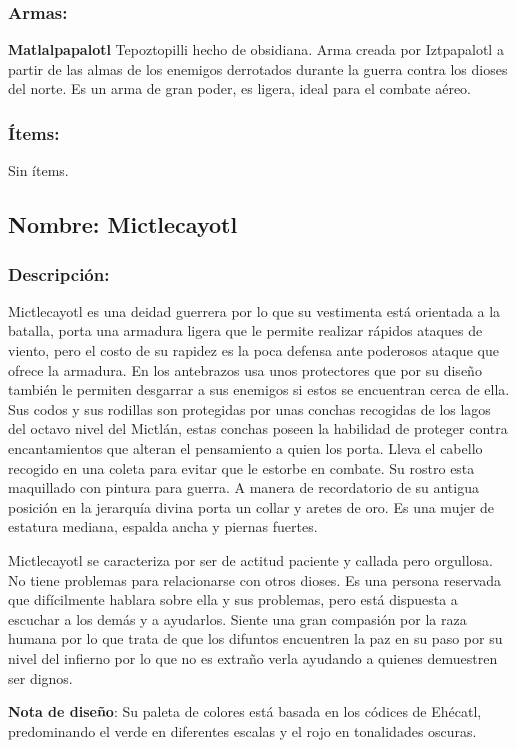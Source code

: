 \documentclass[11pt,letterpaper]{article}
\begin{document}
\subsubsection{Armas:}
\textbf{Matlalpapalotl} Tepoztopilli hecho de obsidiana. Arma creada por Iztpapalotl a partir de las almas de los enemigos derrotados durante la guerra contra los dioses del norte. Es un arma de gran poder, es ligera, ideal para el combate aéreo.
\subsubsection{Ítems:}
Sin ítems.



\subsection{Nombre: Mictlecayotl}  \label{per.mictlecayotl}

\subsubsection{Descripción:}
Mictlecayotl es una deidad guerrera por lo que su vestimenta está orientada a la batalla, porta una armadura ligera que le permite realizar rápidos ataques de viento, pero el costo de su rapidez es la poca defensa ante poderosos ataque que ofrece la armadura. En los antebrazos usa unos protectores que por su diseño también le permiten desgarrar a sus enemigos si estos se encuentran cerca de ella. Sus codos y sus rodillas son protegidas por unas conchas recogidas de los lagos del octavo nivel del Mictlán, estas conchas poseen la habilidad de proteger contra encantamientos que alteran el pensamiento a quien los porta. Lleva el cabello recogido en una coleta para evitar que le estorbe en combate. Su rostro esta maquillado con pintura para guerra. A manera de recordatorio de su antigua posición en la jerarquía divina porta un collar y aretes de oro. Es una mujer de estatura mediana, espalda ancha y piernas fuertes. 
\\
\par
Mictlecayotl se caracteriza por ser de actitud paciente y callada pero orgullosa. No tiene problemas para relacionarse con otros dioses. Es una persona reservada que difícilmente hablara sobre ella y sus problemas, pero está dispuesta a escuchar a los demás y a ayudarlos. Siente una gran compasión por la raza humana por lo que trata de que los difuntos encuentren la paz en su paso por su nivel del infierno por lo que no es extraño verla ayudando a quienes demuestren ser dignos.  
\\
\par
\textbf{Nota de diseño}: Su paleta de colores está basada en los códices de Ehécatl, predominando el verde en diferentes escalas y el rojo en tonalidades oscuras. 	  
\end{document}
